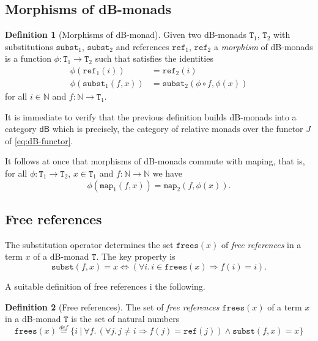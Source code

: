 \documentclass[a4paper,twoside,12pt]{article}
\theoremstyle{definition}
\newtheorem{definition}{Definition}
\theoremstyle{remark}
\theoremstyle{example}
\newcommand{\NN}{\mathbb{N}}
\newcommand{\TT}{\mathtt{T}}
\newcommand{\subst}{\mathtt{subst}}
\newcommand{\refe}{\mathtt{ref}}
\newcommand{\frees}{\mathtt{frees}}
\newcommand{\map}{\mathtt{map}}
\begin{document}
\subsection{Morphisms of dB-monads}
\label{sec:morphisms-db-monads}

\begin{definition}[Morphisms of dB-monad]
  Given two dB-monads $\TT_1$, $\TT_2$ with substitutions $\subst_1$,
  $\subst_2$ and references $\refe_1$, $\refe_2$ a \emph{morphism} of
  dB-monads is a function $\phi\colon \TT_1 \to \TT_2$ such that
  satisfies the  identities
  \begin{align*}
    \phi(\refe_1(i)) &= \refe_2(i) \\
    \phi(\subst_1(f,x)) &= \subst_2(\phi \circ f, \phi(x))
  \end{align*}
  for all $i \in \NN$ and $f\colon \NN \to \TT_1$.
\end{definition}

It is immediate to verify that the previous definition builds
dB-monads into a category $\mathsf{dB}$ which is precisely, the
category of relative monads over the functor $J$ of
\eqref{eq:dB-functor}.

It follows at once that morphisms of dB-monads commute with
maping, that is, for all $\phi\colon \TT_1 \to \TT_2$,
$x\in \TT_1$ and $f\colon \NN\to \NN$ we have
\begin{equation*}
  \phi(\map_1(f,x)) = \map_2(f,\phi(x)) .
\end{equation*}

\subsection{Free references}
\label{sec:free-references}

The substitution operator determines the set $\frees(x)$ of \emph{free
  references} in a term $x$ of a dB-monad $\TT$.  The key property is
\begin{equation*}
  \subst(f,x) = x \Longleftrightarrow
  (\forall i.\, i \in \mathtt{frees}(x) \Longrightarrow f(i) = i).
\end{equation*}

A suitable definition of free references i the following.
\begin{definition}[Free references]
  The set of \emph{free references} $\frees(x)$ of a term $x$ in a
  dB-monad $\TT$ is the set of natural numbers
  \begin{equation*}
    \frees(x) \stackrel{def}{=}
    \Big\{
    i\ \Big|\  \forall f.\, (\forall j.\, j\neq i \Longrightarrow f(j) = \refe(j)) \wedge
    \subst(f,x) = x
    \Big\}
  \end{equation*}
\end{definition}
\end{document}
